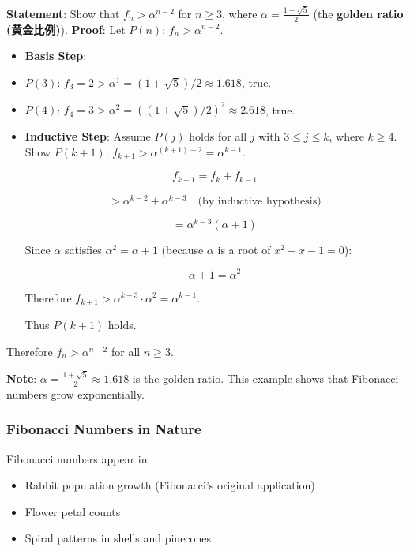 \documentclass[10pt,a4paper,openany]{ctexbook}
\theoremstyle{definition}
\theoremstyle{remark}
\renewenvironment{quote}
  {\list{}{\leftmargin=1em\rightmargin=0pt\topsep=0.5pt\partopsep=0pt}\item[]}
  {\endlist}
\begin{document}
\textbf{Statement}: Show that $f_n > \alpha^{n-2}$ for $n \ge 3$, where $\alpha = \frac{1+\sqrt{5}}{2}$ (the \textbf{golden ratio (黄金比例)}).
\textbf{Proof}:
Let $P(n)$: $f_n > \alpha^{n-2}$.
\begin{itemize}
\item \textbf{Basis Step}:
\item $P(3)$: $f_3 = 2 > \alpha^{1} = (1+\sqrt{5})/2 \approx 1.618$, true.
\item $P(4)$: $f_4 = 3 > \alpha^{2} = ((1+\sqrt{5})/2)^2 \approx 2.618$, true.

\item \textbf{Inductive Step}: Assume $P(j)$ holds for all $j$ with $3 \le j \le k$, where $k \ge 4$.
Show $P(k+1)$: $f_{k+1} > \alpha^{(k+1)-2} = \alpha^{k-1}$.

\[
f_{k+1} = f_k + f_{k-1}
\]

\[
> \alpha^{k-2} + \alpha^{k-3} \quad \text{(by inductive hypothesis)}
\]

\[
= \alpha^{k-3}(\alpha + 1)
\]

Since $\alpha$ satisfies $\alpha^2 = \alpha + 1$ (because $\alpha$ is a root of $x^2 - x - 1 = 0$):

\[
\alpha + 1 = \alpha^2
\]

Therefore $f_{k+1} > \alpha^{k-3} \cdot \alpha^2 = \alpha^{k-1}$.

Thus $P(k+1)$ holds.


\end{itemize}

Therefore $f_n > \alpha^{n-2}$ for all $n \ge 3$.
\begin{quote}
\textbf{Note}: $\alpha = \frac{1+\sqrt{5}}{2} \approx 1.618$ is the golden ratio. This example shows that Fibonacci numbers grow exponentially.

\end{quote}

\subsubsection{Fibonacci Numbers in Nature}

Fibonacci numbers appear in:
\begin{itemize}
\item Rabbit population growth (Fibonacci's original application)
\item Flower petal counts
\item Spiral patterns in shells and pinecones

\end{itemize}
\end{document}
